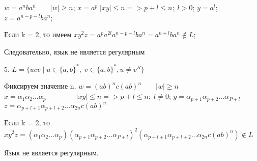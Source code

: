 \documentclass[fleqn]{article}
\begin{document}
$w = a^n b a^n \qquad |w| \geq n $;
$x = a^p  \;  |xy| \leq n  => p + l \leq n ;\; l > 0$;
$y = a^l$;
$z = a^{n-p-l}ba^n $;


Если k = 2, то имеем
$xy^2z = a^pa^{2l}a^{n-p-l}ba^n = a^{n+l}ba^n \notin L$;

Следовательно, язык не является регулярным

5. $L = \{ucv \; | \; u \in \{a,b\}^*, \; v \in \{a,b\}^*, u \neq v^R \}$ 

Фиксируем значение n.
$w = (ab)^n c (ab)^n \qquad |w| \geq n$
$x = \alpha_1\alpha_2...\alpha_p  \qquad\qquad \ |xy| \leq n  =>  p+l \leq n ; \; l \neq 0$;
$y = \alpha_{p+1}\alpha_{p+2}...\alpha_{P+l}$
$z = \alpha_{p+l+1}\alpha_{p+l+2}...\alpha_{2n} c (ab)^n$
 
Если k = 2, то 
$xy^2z = (\alpha_1\alpha_2...\alpha_p)(\alpha_{p+1}\alpha_{p+2}...\alpha_{P+l})^2(\alpha_{p+l+1}\alpha_{p+l+2}...\alpha_{2n} c (ab)^n) \notin L $

Язык не является регулярным.
\end{document}
